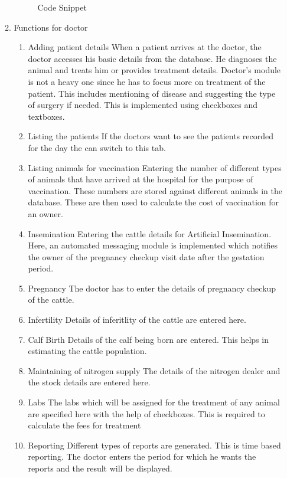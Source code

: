 \documentclass[oneside,a4paper,12pt]{book}
\begin{document}
\begin{appendices}
\begin{enumerate}
\begin{enumerate}
\begin{center}
\begin{figure}[!htbp]
	  \caption{Code Snippet}
	  \label{fig:Code Snippet}
	\end{figure}
\end{center}
\item Functions for doctor
\begin{enumerate}[1.]
\item Adding patient details
When a patient arrives at the doctor, the doctor accesses his basic details from the database.
He diagnoses the animal and treats him or provides treatment details. Doctor’s module is not a heavy one since he has to focus more on treatment of the patient.
This includes mentioning of disease and suggesting the type of surgery if needed.
This is implemented using checkboxes and textboxes.
\item Listing the patients
If the doctors want to see the patients recorded for the day the can switch to this tab.
\item Listing animals for vaccination
Entering the number of different types of animals that have arrived at the hospital for the purpose of vaccination. These numbers are stored against different animals in the database.
These are then used to calculate the cost of vaccination for an owner.
\item 	Insemination
Entering the cattle details for Artificial Insemination.
Here, an automated messaging module is implemented which notifies the owner of  the pregnancy checkup visit date after the gestation period.
\item 	Pregnancy
The doctor has to enter the details of pregnancy checkup of the cattle.
\item 	Infertility
Details of inferitlity of the cattle are entered here.
\item  Calf Birth
Details of the calf being born are entered. This helps in estimating the cattle population.
\item 	Maintaining of nitrogen supply
The details of the nitrogen dealer and the stock details are entered here.
\item 	Labs
The labs which will be assigned for the treatment of any animal are specified here with the help of checkboxes.
This is required to calculate the fees for treatment
\item 	Reporting
Different types of reports are generated. This is time based reporting. The doctor enters the period for which he wants the reports and the result will be displayed.









\end{enumerate}
\end{enumerate}
\end{enumerate}
\end{appendices}
\end{document}
